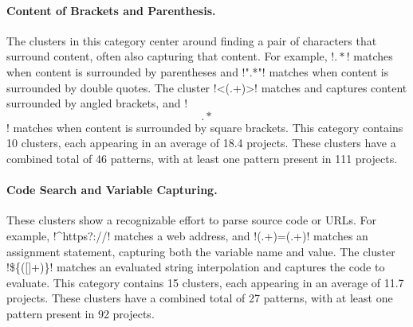\paragraph{Content of Brackets and Parenthesis.}
\label{cluster:contentparens}
The clusters in this category center around finding a pair of characters that surround content, often also capturing that content. For example,
\cverb!\(.*\)! matches when content is surrounded by parentheses and \cverb!".*"! matches  when content is surrounded by double quotes.  The cluster \cverb!<(.+)>! matches and captures content surrounded by angled brackets, and \cverb!\[.*\]! matches when content is surrounded by square brackets.
This category contains 10 clusters, each appearing in an average of 18.4 projects.
 These clusters have a combined total of 46 patterns, with at least one pattern present in 111 projects.

\paragraph{Code Search and Variable Capturing.}
\label{cluster:search}
These clusters show a recognizable effort to parse source code or URLs. For example,
\cverb!^https?://! matches a web address, and \cverb!(.+)=(.+)! matches an assignment statement, capturing both the variable name and value.
The cluster  \cverb!\$\{([\w\-]+)\}! matches an evaluated string interpolation and captures the code to evaluate.
This category contains 15 clusters, each appearing in an average of 11.7 projects.
These clusters have a combined total of 27 patterns, with at least one pattern present in 92 projects.

